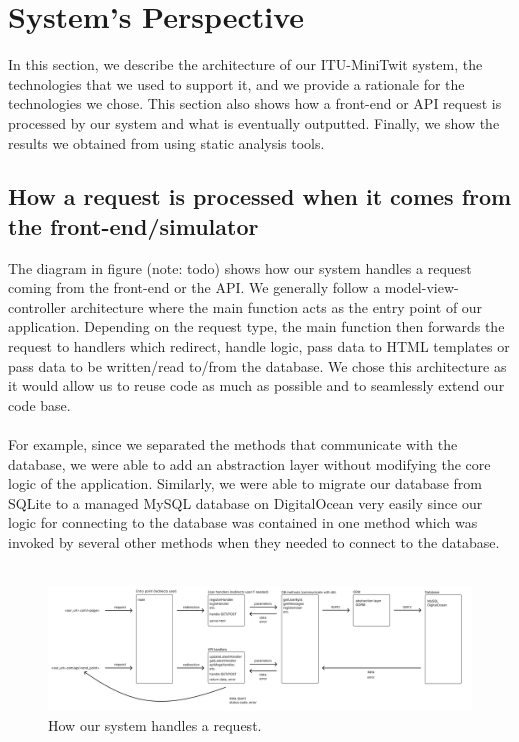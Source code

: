 \documentclass{article}
\begin{document}
\section{System's Perspective}
In this section, we describe the architecture of our ITU-MiniTwit system, the technologies that we used to support it, and we provide a rationale for the technologies we chose. This section also shows how a front-end or API request is processed by our system and what is eventually outputted. Finally, we show the results we obtained from using static analysis tools.

\subsection{How a request is processed when it comes from the front-end/simulator}
The diagram in figure (note: todo) shows how our system handles a request coming from the front-end or the API. We generally follow a model-view-controller architecture where the main function acts as the entry point of our application. Depending on the request type, the main function then forwards the request to handlers which redirect, handle logic, pass data to HTML templates or pass data to be written/read to/from the database. We chose this architecture as it would allow us to reuse code as much as possible and to seamlessly extend our code base. 
\\\\
For example, since we separated the methods that communicate with the database, we were able to add an abstraction layer without modifying the core logic of the application. Similarly, we were able to migrate our database from SQLite to a managed MySQL database on DigitalOcean very easily since our logic for connecting to the database was contained in one method which was invoked by several other methods when they needed to connect to the database.
\\\\
\begin{figure}[ht]
    \centering
    \includegraphics[width=1.0\textwidth]{./images/request_pipeline.png}
    \caption{How our system handles a request.}
    \label{fig:notion-dashboard}
\end{figure}
\end{document}
